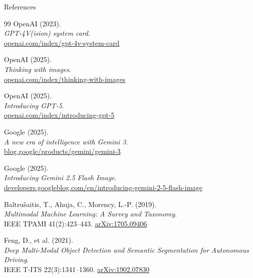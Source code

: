 \begin{frame}[allowframebreaks]{References}
\begin{thebibliography}{99}
      OpenAI (2023). \\
      \emph{GPT-4V(ision) system card}.\\
      \href{https://openai.com/index/gpt-4v-system-card/}{openai.com/index/gpt-4v-system-card}

      OpenAI (2025). \\
      \emph{Thinking with images}.\\
      \href{https://openai.com/index/thinking-with-images/}{openai.com/index/thinking-with-images}

      OpenAI (2025). \\
      \emph{Introducing GPT-5}.\\
      \href{https://openai.com/index/introducing-gpt-5/}{openai.com/index/introducing-gpt-5}

      Google (2025). \\
      \emph{A new era of intelligence with Gemini 3}.\\
      \href{https://blog.google/products/gemini/gemini-3/}{blog.google/products/gemini/gemini-3}

      Google (2025). \\
      \emph{Introducing Gemini 2.5 Flash Image}.\\
      \href{https://developers.googleblog.com/en/introducing-gemini-2-5-flash-image/}{developers.googleblog.com/en/introducing-gemini-2-5-flash-image}

      Baltru\v{s}aitis, T., Ahuja, C., Morency, L.-P. (2019). \\
      \emph{Multimodal Machine Learning: A Survey and Taxonomy}.\\
      IEEE TPAMI 41(2):423--443. \href{https://arxiv.org/abs/1705.09406}{arXiv:1705.09406}

      Feng, D., et al. (2021). \\
      \emph{Deep Multi-Modal Object Detection and Semantic Segmentation for Autonomous Driving}.\\
      IEEE T-ITS 22(3):1341--1360. \href{https://arxiv.org/abs/1902.07830}{arXiv:1902.07830}
  \end{thebibliography}
\end{frame}
